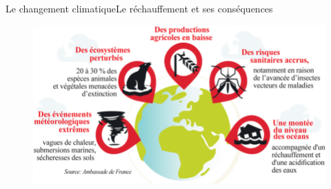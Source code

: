 
\begin{frame}{Le changement climatique}{Le réchauffement et ses conséquences}

\begin{figure}
	\centering
	\includegraphics[scale=0.37]{Feathergraphics/effetChgmtClimat.png}
\end{figure}

\end{frame}
